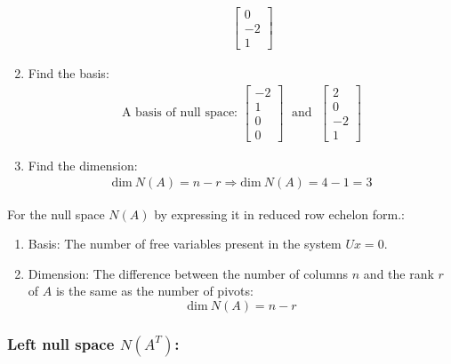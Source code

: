 \documentclass[10pt,a4paper]{article}
\begin{document}
\begin{enumerate}
\begin{itemize}
\begin{align*}
\begin{bmatrix}
                0 \\
                -2 \\
                1
            \end{bmatrix}    
        \end{align*}
    \end{itemize}
    \item Find the basis:
    \begin{align*}
        \text{A basis of null space: } \begin{bmatrix}
            -2 \\
            1 \\
            0 \\
            0
        \end{bmatrix} \; \text{ and } \;
        \begin{bmatrix}
            2 \\
            0 \\
            -2 \\
            1
        \end{bmatrix}
    \end{align*}
    \item Find the dimension:
    \begin{align*}
        \text{dim}\: N(A) = n - r \Rightarrow \text{dim}\: N(A) = 4 - 1 = 3
    \end{align*}
\end{enumerate}

\begin{tcolorbox}[breakable,colback=white]
    For the null space $N(A)$ by expressing it in reduced row echelon form.:
    \begin{enumerate}
        \item Basis: The number of free variables present in the system $Ux=0$.
        \item Dimension: The difference between the number of columns $n$ and the rank $r$ of $A$ is the same as the number of pivots:
        $$
            \text{dim}\: N(A) = n - r
        $$
    \end{enumerate}
\end{tcolorbox}

\subsubsection{Left null space $N(A^T)$:}
\end{document}
